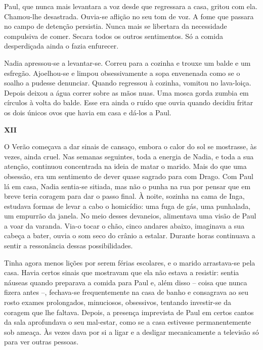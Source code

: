 Paul, que nunca mais levantara a voz desde que regressara a casa,
gritou com ela. Chamou-lhe desastrada. Ouvia-se aflição no seu tom de voz. A fome que passara no campo de detenção
persistia. Nunca mais se libertara da necessidade compulsiva de comer.
Secara todos os outros sentimentos. Só a comida desperdiçada ainda o
fazia enfurecer.

Nadia apressou-se a levantar-se. Correu para a cozinha e trouxe um balde
e um esfregão. Ajoelhou-se e limpou obsessivamente a sopa envenenada
como se o soalho a pudesse denunciar. Quando regressou à cozinha,
vomitou no lava-loiça. Depois deixou a água correr sobre as mãos nuas.
Uma mosca gorda zumbia em círculos à volta do balde. Esse era ainda o
ruído que ouvia quando decidiu fritar os dois únicos ovos que havia em
casa e dá-los a Paul.

\pagebreak
\vspace*{1.8cm}
\noindent{}\textbf{XII}

\bigskip

O Verão começava a dar sinais de cansaço, embora o calor do sol se
mostrasse, às vezes, ainda cruel. Nas semanas seguintes, toda a
energia de Nadia, e toda a sua atenção, continuou concentrada na ideia
de matar o marido. Mais do que uma obsessão, era um sentimento de dever
quase sagrado para com Drago. Com Paul lá em casa, Nadia sentia-se
sitiada, mas não o punha na rua por pensar que em breve teria coragem
para dar o passo final. À noite, sozinha na cama de Inga, estudava
formas de levar a cabo o homicídio: uma fuga de gás, uma punhalada, um
empurrão da janela. No meio desses devaneios, alimentava uma visão de
Paul a voar da varanda. Via-o tocar o chão, cinco andares abaixo,
imaginava a sua cabeça a bater, ouvia o som seco do crânio a estalar.
Durante horas continuava a sentir a ressonância dessas possibilidades.

Tinha agora menos lições por serem férias escolares, e
o marido arrastava-se pela casa. Havia certos sinais que mostravam que
ela não estava a resistir: sentia náuseas quando preparava a comida para
Paul e, além disso -- coisa que nunca fizera antes --, fechava-se
frequentemente na
casa de banho e consagrava ao seu rosto exames prolongados,
minuciosos, obsessivos, tentando investir-se da coragem que lhe faltava.
Depois, a presença imprevista de Paul em certos cantos da sala
aprofundava o seu mal-estar, como se a casa estivesse permanentemente
sob ameaça. Às vezes dava por si a ligar e a desligar mecanicamente a
televisão só para ver outras pessoas.

